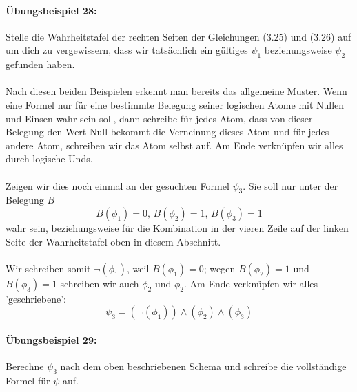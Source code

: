 \documentclass[11pt,a4paper,leqno]{report}
\numberwithin{equation}{chapter}
\begin{document}
\paragraph{\"Ubungsbeispiel 28:} Stelle die Wahrheitstafel der rechten Seiten der Gleichungen (3.25) und (3.26) auf um dich zu vergewissern, dass wir tats\"achlich ein g\"ultiges $\psi_1$ beziehungsweise $\psi_2$ gefunden haben.\\
\\
Nach diesen beiden Beispielen erkennt man bereits das allgemeine Muster. Wenn eine Formel nur f\"ur eine bestimmte Belegung seiner logischen Atome mit Nullen und Einsen wahr sein soll, dann schreibe f\"ur jedes Atom, dass von dieser Belegung den Wert Null bekommt die Verneinung dieses Atom und f\"ur jedes andere Atom, schreiben wir das Atom selbst auf. Am Ende verkn\"upfen wir alles durch logische Unds.\\
\\
Zeigen wir dies noch einmal an der gesuchten Formel $\psi_3$. Sie soll nur unter der Belegung $B$
\begin{equation}
	B(\phi_1)=0\text{, }B(\phi_2)=1\text{, }B(\phi_3)=1
\end{equation}
wahr sein, beziehungsweise f\"ur die Kombination in der vieren Zeile auf der linken Seite der Wahrheitstafel oben in diesem Abschnitt.\\
\\
Wir schreiben somit $\neg(\phi_1)$, weil $B(\phi_1)=0$; wegen $B(\phi_2)=1$ und $B(\phi_3)=1$ schreiben wir auch $\phi_2$ und $\phi_2$. Am Ende verkn\"upfen wir alles 'geschriebene':
\begin{equation}
	\psi_3 = (\neg(\phi_1))\wedge(\phi_2)\wedge(\phi_3)
\end{equation}
\paragraph{\"Ubungsbeispiel 29:} Berechne $\psi_3$ nach dem oben beschriebenen Schema und schreibe die vollst\"andige Formel f\"ur $\psi$ auf.
\newpage
\end{document}
